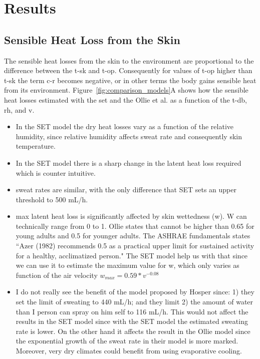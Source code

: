 

\section{Results}\label{sec:results}

\subsection{Sensible Heat Loss from the Skin}\label{subsec:sensible-heat-loss-from-the-skin}

The sensible heat losses from the skin to the environment are proportional to the difference between the \ac{t-sk} and \ac{t-op}.
Consequently for values of \ac{t-op} higher than \ac{t-sk} the term \ac{c-r} becomes negative, or in other terms the body gains sensible heat from its environment.
Figure~\ref{fig:comparison_models}A shows how the sensible heat losses estimated with the \ac{set} and the Ollie et al.  as a function of the \ac{t-db}, \ac{rh}, and \ac{v}.

\begin{itemize}
    \item In the SET model the dry heat losses vary as a function of the relative humidity, since relative humidity affects sweat rate and consequently skin temperature.
    \item In the SET model there is a sharp change in the latent heat loss required which is counter intuitive.
    \item sweat rates are similar, with the only difference that SET sets an upper threshold to 500 mL/h.
    \item max latent heat loss is significantly affected by skin wettedness (w). W can technically range from 0 to 1.
    Ollie states that cannot be higher than 0.65 for young adults and 0.5 for younger adults.
    The ASHRAE fundamentals states ``Azer (1982) recommends 0.5 as a practical upper limit for sustained activity for a healthy, acclimatized person."
    The SET model help us with that since we can use it to estimate the maximum value for w, which only varies as function of the air velocity $w_{max} = 0.59 * v^{-0.08}$
    \item I do not really see the benefit of the model proposed by Hosper since: 1) they set the limit of sweating to 440 mL/h; and they limit 2) the amount of water than I person can spray on him self to 116 mL/h. This would not affect the results in the SET model since with the SET model the estimated sweating rate is lower.
    On the other hand it affects the result in the Ollie model since the exponential growth of the sweat rate in their model is more marked.
    Moreover, very dry climates could benefit from using evaporative cooling.
\end{itemize}

